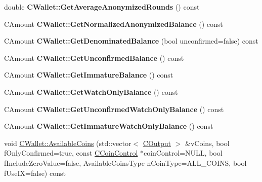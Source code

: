 \begin{DoxyCompactItemize}
\item 
\mbox{\label{group___actions_gaccf9e710f6c24cc4258986adc3513685}} 
double {\bfseries C\+Wallet\+::\+Get\+Average\+Anonymized\+Rounds} () const
\item 
\mbox{\label{group___actions_ga24e9c793a438c84b48811bd5b7d4edc6}} 
C\+Amount {\bfseries C\+Wallet\+::\+Get\+Normalized\+Anonymized\+Balance} () const
\item 
\mbox{\label{group___actions_ga3d9f78bd52a2bd03a9e79c1a84e76cd7}} 
C\+Amount {\bfseries C\+Wallet\+::\+Get\+Denominated\+Balance} (bool unconfirmed=false) const
\item 
\mbox{\label{group___actions_ga6e6e1497535d499242c2f2a76d1cbe63}} 
C\+Amount {\bfseries C\+Wallet\+::\+Get\+Unconfirmed\+Balance} () const
\item 
\mbox{\label{group___actions_ga6ab8dfa75c5c8d5539325f3981697964}} 
C\+Amount {\bfseries C\+Wallet\+::\+Get\+Immature\+Balance} () const
\item 
\mbox{\label{group___actions_ga92a58ebac7d7d398597657600db56611}} 
C\+Amount {\bfseries C\+Wallet\+::\+Get\+Watch\+Only\+Balance} () const
\item 
\mbox{\label{group___actions_gab0c110f14f0429f9de594b2293837621}} 
C\+Amount {\bfseries C\+Wallet\+::\+Get\+Unconfirmed\+Watch\+Only\+Balance} () const
\item 
\mbox{\label{group___actions_ga1372ba886aaeda65bf28758c9ccb65b4}} 
C\+Amount {\bfseries C\+Wallet\+::\+Get\+Immature\+Watch\+Only\+Balance} () const
\item 
void \mbox{\hyperlink{group___actions_ga8110e889be0f5915104e07bfe3839c68}{C\+Wallet\+::\+Available\+Coins}} (std\+::vector$<$ \mbox{\hyperlink{class_c_output}{C\+Output}} $>$ \&v\+Coins, bool f\+Only\+Confirmed=true, const \mbox{\hyperlink{class_c_coin_control}{C\+Coin\+Control}} $\ast$coin\+Control=N\+U\+LL, bool f\+Include\+Zero\+Value=false, Available\+Coins\+Type n\+Coin\+Type=A\+L\+L\+\_\+\+C\+O\+I\+NS, bool f\+Use\+IX=false) const
\item 
\mbox{\label{group___actions_gad32b1df139d0c2e26903f4e5ceaabe61}} 

\end{DoxyCompactItemize}
